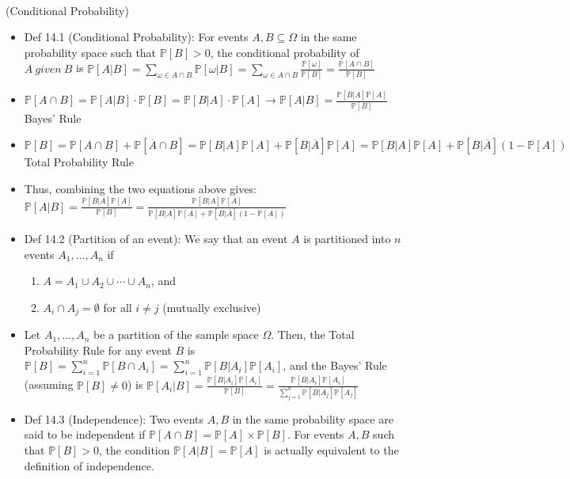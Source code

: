 \documentclass{article}
\begin{document}
 \\
(Conditional Probability)
\begin{itemize}
	\item Def 14.1 (Conditional Probability): For events $A,B \subseteq\Omega$ in the same probability space such that $\mathbb{P}[B]>0$, the conditional probability of $A\ given\ B$ is $\mathbb{P}[A|B] = \sum\limits_{\omega\in A\cap B} \mathbb{P}[\omega|B] = \sum\limits_{\omega\in A\cap B} \frac{\mathbb{P}[\omega]}{\mathbb{P}[B]} = \frac{\mathbb{P}[A\cap B]}{\mathbb{P}[B]}$
	\item $\mathbb{P}[A\cap B] = \mathbb{P}[A|B]\cdot\mathbb{P}[B] = \mathbb{P}[B|A]\cdot\mathbb{P}[A]\longrightarrow\mathbb{P}[A|B] = \frac{\mathbb{P}[B|A]\mathbb{P}[A]}{\mathbb{P}[B]}$ Bayes' Rule
	\item $\mathbb{P}[B] = \mathbb{P}[A\cap B] + \mathbb{P}[\overline{A}\cap B] = \mathbb{P}[B|A]\mathbb{P}[A] + \mathbb{P}[B|\overline{A}]\mathbb{P}[A] = \mathbb{P}[B|A]\mathbb{P}[A] + \mathbb{P}[B|\overline{A}](1-\mathbb{P}[A])$ Total Probability Rule
	\item Thus, combining the two equations above gives: $\mathbb{P}[A|B] = \frac{\mathbb{P}[B|A]\mathbb{P}[A]}{\mathbb{P}[B]} = \frac{\mathbb{P}[B|A]\mathbb{P}[A]}{\mathbb{P}[B|A]\mathbb{P}[A] + \mathbb{P}[B|\overline{A}](1-\mathbb{P}[A])}$
	\item Def 14.2 (Partition of an event): We say that an event $A$ is partitioned into $n$ events $A_1,\dots,A_n$ if
	\begin{enumerate}
		\item $A = A_1\cup A_2\cup \cdots \cup A_n$, and
		\item $A_i\cap A_j = \emptyset$ for all $i\neq j$ (mutually exclusive)
	\end{enumerate}
	\item Let $A_1,\dots,A_n$ be a partition of the sample space $\Omega$. Then, the Total Probability Rule for any event $B$ is $\mathbb{P}[B] = \sum\limits_{i=1}^n \mathbb{P}[B\cap A_i] = \sum\limits_{i=1}^n \mathbb{P}[B|A_i]\mathbb{P}[A_i]$, and the Bayes' Rule (assuming $\mathbb{P}[B]\neq0$) is $\mathbb{P}[A_i|B] = \frac{\mathbb{P}[B|A_i]\mathbb{P}[A_i]}{\mathbb{P}[B]} = \frac{\mathbb{P}[B|A_i]\mathbb{P}[A_i]}{\sum\limits_{j=1}^n \mathbb{P}[B|A_j]\mathbb{P}[A_j]}$
	\item Def 14.3 (Independence): Two events $A,B$ in the same probability space are said to be independent if $\mathbb{P}[A\cap B] = \mathbb{P}[A]\times \mathbb{P}[B]$. For events $A,B$ such that $\mathbb{P}[B] > 0$, the condition $\mathbb{P}[A|B] = \mathbb{P}[A]$ is actually equivalent to the definition of independence.

\end{itemize}
\end{document}
